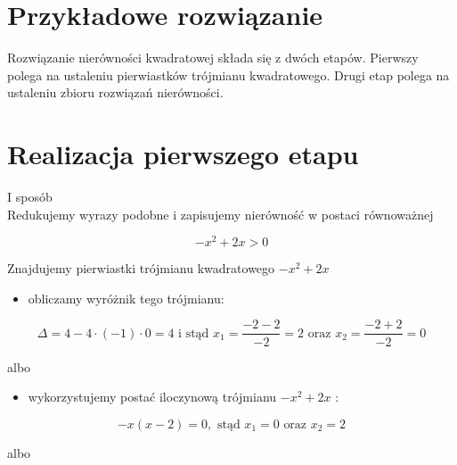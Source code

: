 \documentclass[10pt]{article}
\begin{document}
\section*{Przykładowe rozwiązanie}
Rozwiązanie nierówności kwadratowej składa się z dwóch etapów. Pierwszy polega na ustaleniu pierwiastków trójmianu kwadratowego. Drugi etap polega na ustaleniu zbioru rozwiązań nierówności.

\section*{Realizacja pierwszego etapu}
I sposób\\
Redukujemy wyrazy podobne i zapisujemy nierówność w postaci równoważnej

$$
-x^{2}+2 x>0
$$

Znajdujemy pierwiastki trójmianu kwadratowego $-x^{2}+2 x$

\begin{itemize}
  \item obliczamy wyróżnik tego trójmianu:
\end{itemize}

$$
\Delta=4-4 \cdot(-1) \cdot 0=4 \text { i stąd } x_{1}=\frac{-2-2}{-2}=2 \text { oraz } x_{2}=\frac{-2+2}{-2}=0
$$

albo

\begin{itemize}
  \item wykorzystujemy postać iloczynową trójmianu $-x^{2}+2 x$ :
\end{itemize}

$$
-x(x-2)=0, \text { stąd } x_{1}=0 \text { oraz } x_{2}=2
$$

albo
\end{document}
